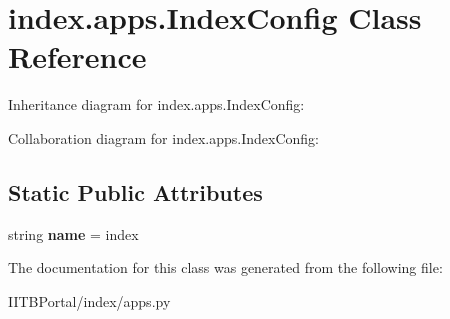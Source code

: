 \hypertarget{classindex_1_1apps_1_1IndexConfig}{}\section{index.\+apps.\+Index\+Config Class Reference}
\label{classindex_1_1apps_1_1IndexConfig}


Inheritance diagram for index.\+apps.\+Index\+Config\+:


Collaboration diagram for index.\+apps.\+Index\+Config\+:
\subsection*{Static Public Attributes}
\begin{DoxyCompactItemize}
\item 
\mbox{\label{classindex_1_1apps_1_1IndexConfig_ab0069d4133ec8356d0cfed0e2a809f25}} 
string {\bfseries name} = \textquotesingle{}index\textquotesingle{}
\end{DoxyCompactItemize}


The documentation for this class was generated from the following file\+:\begin{DoxyCompactItemize}
\item 
I\+I\+T\+B\+Portal/index/apps.\+py\end{DoxyCompactItemize}
